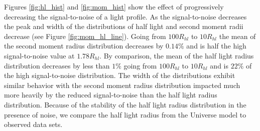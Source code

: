 \documentclass[]{article}
\begin{document}
Figures \ref{fig:hl_hist} and \ref{fig:mom_hist} show the effect of
progressively decreasing the signal-to-noise of a light profile.  As
the signal-to-noise decreases the peak and width of the distributions
of half light and second moment radii decrease (see Figure
\ref{fig:mom_hl_line}).  Going from $100R_{hl}$ to $10R_{hl}$ the mean
of the second moment radius distribution decreases by $0.14\%$ and is
half the high signal-to-noise value at $1.78R_{hl}$.  By comparison,
the mean of the half light radius distribution decreases by less than
$1\%$ going from $100R_{hl}$ to $10R_{hl}$ and is $22\%$ of the high
signal-to-noise distribution.  The width of the distributions exhibit
similar behavior with the second moment radius distribution impacted
much more heavily by the reduced signal-to-noise than the half light
radius distribution.  Because of the stability of the half light
radius distribution in the presence of noise, we compare the half
light radius from the Universe model to observed data sets.
\end{document}
